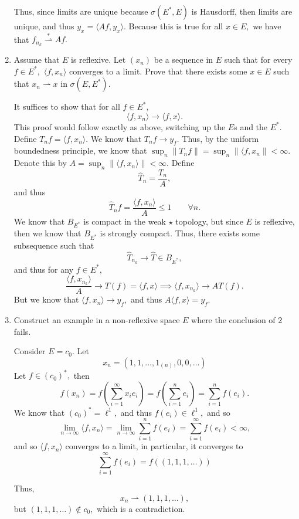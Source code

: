 \documentclass[11pt]{article}
\begin{document}
\begin{problem}
\begin{enumerate}
\begin{solution}
        Thus, since limits are unique because $\sigma(E^*, E)$ is Hausdorff, then limits are unique, and thus $y_x = \langle Af, y_x\rangle.$ Because this is true for all $x \in E,$ we have that $f_{n_k} \stackrel{\ast}{\rightharpoonup}  Af.$ 
    \end{solution}
    \item Assume that $E$ is reflexive. Let $(x_n)$ be a sequence in $E$ such that for every $f\in E^*,$ $\langle f, x_n \rangle$ converges to a limit. Prove that there exists some $x\in E$ such that $x_n \rightharpoonup x$ in $\sigma(E, E^*).$
    \begin{solution}
        It suffices to show that for all $f\in E^*,$ 
        \[\langle f, x_n \rangle \to \langle f, x\rangle.\] This proof would follow exactly as above, switching up the $E$s and the $E^*.$ 
        Define $T_nf = \langle f, x_n\rangle.$ We know that $T_nf \to y_f.$ Thus, by the uniform boundedness principle, we know that $\sup_{n}\|T_nf\| = \sup_{n}\|\langle f, x_n\| < \infty.$ Denote this by $A = \sup_{n}\|\langle f, x_n\rangle\| < \infty.$ Define 
        \[\hat{T}_n = \frac{T_n}{A},\] and thus 
        \[\hat{T}_nf = \frac{\langle f, x_n \rangle}{A} \leq 1 \qquad \forall n.\] We know that $B_{E^*}$ is compact in the weak $\star$ topology, but since $E$ is reflexive, then we know that $B_{E^*}$ is strongly compact. Thus, there exists some subsequence such that 
        \[\hat{T}_{n_k} \to \hat{T}\in B_{E^*},\] and thus for any $f\in E^*,$
        \[\frac{\langle f, x_{n_k} \rangle}{A} \to T(f) = \langle f, x\rangle \implies \langle f, x_{n_k}\rangle \to AT(f).\] But we know that $\langle f, x_n \rangle \to y_f,$ and thus $A\langle f, x\rangle = y_f.$
    \end{solution}
    \item 
    \begin{problem}
        Construct an example in a non-reflexive space $E$ where the conclusion of 2 fails.
    \end{problem}
    \begin{solution}
        Consider $E = c_0.$ Let 
        \[x_n = (1, 1, \dots, 1_{(n)}, 0, 0 , \dots)\] Let $f\in (c_0)^*,$ then 
        \[f(x_n) = f\left(\sum_{i=1}^\infty x_i e_i\right) = f\left(\sum_{i=1}^n e_i\right) = \sum_{i=1}^n f(e_i).\] We know that $(c_0)^* = \ell^1,$ and thus $f(e_i)\in \ell^1,$ and so 
        \[\lim_{n\to \infty} \langle f, x_n \rangle = \lim_{n\to \infty}\sum_{i=1}^n f(e_i) = \sum_{i=1}^\infty f(e_i)< \infty,\] and so $\langle f, x_n \rangle$ converges to a limit, in particular, it converges to 
        \[\sum_{i=1}^\infty f(e_i) = f((1,1,1,\dots))\]
        
        Thus, 
        \[x_n \rightharpoonup (1,1,1,\dots),\] but $(1,1,1,\dots)\notin c_0,$ which is a contradiction.
    \end{solution}
        \end{enumerate}

\end{problem}
\end{document}
